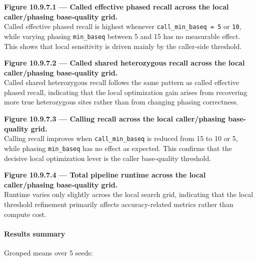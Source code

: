 \documentclass[
]{article}
\begin{document}
\textbf{Figure 10.9.7.1 --- Called effective phased recall across the
local caller/phasing base-quality grid.}\\
Called effective phased recall is highest whenever
\texttt{call\_min\_baseq\ =\ 5} or \texttt{10}, while varying phasing
\texttt{min\_baseq} between 5 and 15 has no measurable effect. This
shows that local sensitivity is driven mainly by the caller-side
threshold.

\textbf{Figure 10.9.7.2 --- Called shared heterozygous recall across the
local caller/phasing base-quality grid.}\\
Called shared heterozygous recall follows the same pattern as called
effective phased recall, indicating that the local optimization gain
arises from recovering more true heterozygous sites rather than from
changing phasing correctness.

\textbf{Figure 10.9.7.3 --- Calling recall across the local
caller/phasing base-quality grid.}\\
Calling recall improves when \texttt{call\_min\_baseq} is reduced from
15 to 10 or 5, while phasing \texttt{min\_baseq} has no effect as
expected. This confirms that the decisive local optimization lever is
the caller base-quality threshold.

\textbf{Figure 10.9.7.4 --- Total pipeline runtime across the local
caller/phasing base-quality grid.}\\
Runtime varies only slightly across the local search grid, indicating
that the local threshold refinement primarily affects accuracy-related
metrics rather than compute cost.

\paragraph{Results summary}\label{results-summary-6}

Grouped means over 5 seeds:
\end{document}
